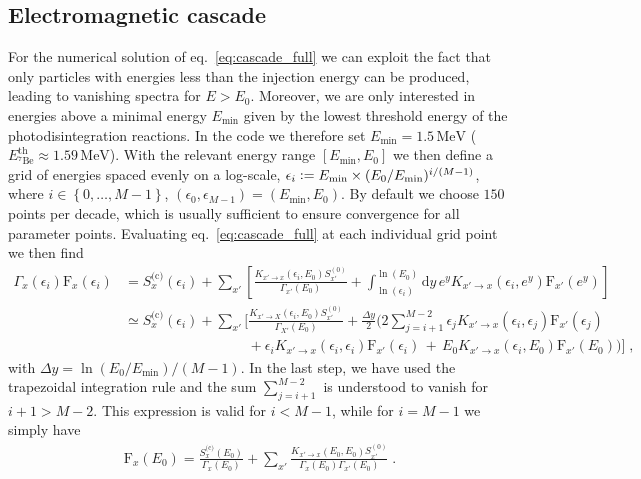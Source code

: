 \documentclass[11pt,a4paper]{article}
\newcommand{\Fpdi}{\mathrm{F}}
\newcommand{\eqsp}{\;}
\newcommand{\e}{\,}
\newcommand{\X}{x}
\newcommand{\ldefine}{\vcentcolon=}
\begin{document}
\subsection{Electromagnetic cascade}
For the numerical solution of eq.~\eqref{eq:cascade_full} we can exploit the fact that only particles with energies less than the injection energy can be produced, leading to vanishing spectra for $E > E_0$. Moreover, we are only interested in energies above a minimal energy $E_\text{min}$ given by the lowest threshold energy of the photodisintegration reactions. In the code we therefore set $E_\text{min} = 1.5\e\mathrm{MeV}$ ($E_{{}^7\mathrm{Be}}^\mathrm{th} \approx 1.59 \, \mathrm{MeV}$). With the relevant energy range $[E_\text{min}, E_0]$ we then define a grid of energies spaced evenly on a log-scale, $\epsilon_i \ldefine E_\text{min} \times (E_0 / E_\text{min})^{i/(M-1)}$, where $i \in \left\{ 0, \dots, M-1 \right\}$, $(\epsilon_0, \epsilon_{M-1}) = (E_\text{min}, E_0)$. By default we choose $150$ points per decade, which is usually sufficient to ensure convergence for all parameter points. Evaluating eq.~\eqref{eq:cascade_full} at each individual grid point we then find~\cite{Hufnagel:2020nxa}
\begin{align}
\Gamma_\X(\epsilon_i) \Fpdi_\X(\epsilon_i)  &= S_\X^{\text{(c)}}(\epsilon_i) + \sum_{\X'} \left[ \frac{K_{\X' \to \X} (\epsilon_i, E_0) S_{\X'}^{(0)}}{\Gamma_{\X'} (E_0)} + \int_{\ln(\epsilon_i)}^{\ln(E_0)} \text{d} y \, e^y K_{\X' \to \X} (\epsilon_i, e^y) \Fpdi_{\X'}(e^y)\right] \nonumber \\[4mm]
&\simeq S_\X^{\text{(c)}}(\epsilon_i) +  \sum_{\X'} \bigg[ \frac{K_{\X' \to X} (\epsilon_i, E_0) S_{\X'}^{(0)}}{\Gamma_{X'} (E_0)} + \frac{\Delta y}{2} \bigg( 2 \sum_{j=i+1}^{M-2} \epsilon_j K_{\X' \to \X} (\epsilon_i, \epsilon_j) \Fpdi_{\X'}(\epsilon_j)\nonumber\\
&\qquad\quad\qquad\qquad\quad\;\;\; +\epsilon_i K_{\X' \to \X} (\epsilon_i, \epsilon_i) \Fpdi_{\X'}(\epsilon_i)\,  +\,  E_0 K_{\X' \to \X} (\epsilon_i, E_0) \Fpdi_{\X'}(E_0) \bigg) \bigg]\eqsp,
\label{eq:FXi}
\end{align}
with $\Delta y = \ln(E_0/E_\text{min})/(M-1)$. In the last step, we have used the trapezoidal integration rule and the sum $\sum_{j=i+1}^{M-2}$ is understood to vanish for $i +1 > M - 2$. This expression is valid for $i < M -1$, while for $i=M-1$ we simply have
\begin{align}
\Fpdi_\X(E_0) = \frac{S_\X^{\text{(c)}}(E_0)}{\Gamma_\X(E_0)} + \sum_{\X'} \frac{K_{\X' \to \X} (E_0, E_0) S_{\X'}^{(0)}}{\Gamma_\X(E_0) \Gamma_{\X'} (E_0)}\eqsp.
\label{eq:FX_ES}
\end{align}
\end{document}
